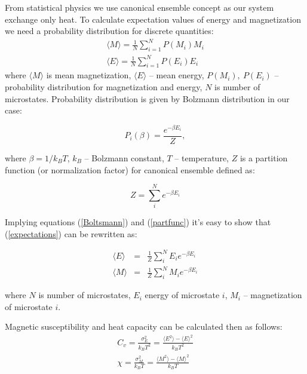 \documentclass[10pt]{article}
\begin{document}
From statistical physics we use canonical ensemble concept as our system exchange only heat. To calculate expectation values of energy and magnetization we need a probability distribution for discrete quantities:
\begin{equation}\label{expectations}
\begin{aligned}
\langle M \rangle =\frac {1}{N}\sum_{i=1}^{N} P(M_i)M_i \\
\langle E \rangle = \frac {1}{N}\sum_{i=1}^{N} P(E_i)E_i
\end{aligned}
\end{equation}
where $\langle M \rangle$ is mean magnetization, $\langle E \rangle$ -- mean energy,
$P(M_i),\ P(E_i)$ -- probability distribution for magnetization and energy, $N$ is number of microstates.
Probability distribution is given by Bolzmann distribution in our case:

\begin{equation}\label{Boltsmann}
P_i(\beta)=\frac {e^{-\beta E_i}}{Z},
\end{equation}

where $\beta = 1/k_BT$, $k_B$ -- Bolzmann constant, $T$ -- temperature, $Z$ is a partition function (or
normalization factor) for canonical ensemble defined as:

\begin{equation}\label{partfunc}
Z=\sum_{i}^{N}e^{-\beta E_{i}}
\end{equation}

Implying equations (\ref{Boltsmann}) and (\ref{partfunc}) it's easy to show that (\ref{expectations}) can be rewritten as:

\begin{equation}
\begin{aligned}
\langle E\rangle &=&\frac{1}{Z}\sum_{i}^{N}E_{i}e^{-\beta E_{i}} \\
\langle M\rangle &=&\frac{1}{Z}\sum_{i}^{N}M_{i}e^{-\beta E_{i}}
\end{aligned}
\end{equation}

where $N$ is number of microstates, $E_{i}$ energy of microstate $i$, $M_{i}$ -- magnetization of microstate $i$. 

Magnetic susceptibility and heat capacity can be calculated then as follows: 
\begin{equation}\label{cv_xi}
\begin{aligned}
C_{v}=\frac{\sigma^2 _{E}}{k_{B}T^{2}}=\frac{\langle E^{2}\rangle -\langle E\rangle ^{2}}{k_{B}T^2} \\
\chi =\frac{\sigma^2 _{M}}{k_{B}T}=\frac{\langle M^{2}\rangle -\langle M\rangle ^{2}}{k_{B}T}
\end{aligned}
\end{equation}
\end{document}
